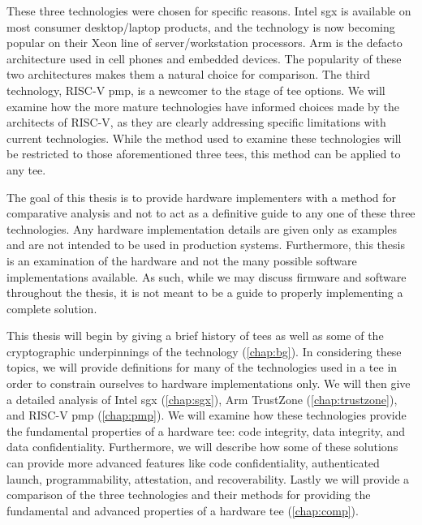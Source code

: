 These three technologies were chosen for specific reasons. Intel \gls{sgx} is available on most consumer desktop/laptop products, and the technology is now becoming popular on their Xeon line of server/workstation processors. Arm is the defacto architecture used in cell phones and embedded devices. The popularity of these two architectures makes them a natural choice for comparison. The third technology, RISC-V \gls{pmp}, is a newcomer to the stage of \gls{tee} options. We will examine how the more mature technologies have informed choices made by the architects of RISC-V, as they are clearly addressing specific limitations with current technologies. While the method used to examine these technologies will be restricted to those aforementioned three \glspl{tee}, this method can be applied to any \gls{tee}.

The goal of this thesis is to provide hardware implementers with a method for comparative analysis and not to act as a definitive guide to any one of these three technologies. Any hardware implementation details are given only as examples and are not intended to be used in production systems. Furthermore, this thesis is an examination of the hardware and not the many possible software implementations available. As such, while we may discuss firmware and software throughout the thesis, it is not meant to be a guide to properly implementing a complete solution.

This thesis will begin by giving a brief history of \glspl{tee} as well as some of the cryptographic underpinnings of the technology (\autoref{chap:bg}). In considering these topics, we will provide definitions for many of the technologies used in a \gls{tee} in order to constrain ourselves to hardware implementations only. We will then give a detailed analysis of Intel \gls{sgx} (\autoref{chap:sgx}), Arm TrustZone (\autoref{chap:trustzone}), and RISC-V \gls{pmp} (\autoref{chap:pmp}). We will examine how these technologies provide the fundamental properties of a hardware \gls{tee}: code integrity, data integrity, and data confidentiality. Furthermore, we will describe how some of these solutions can provide more advanced features like code confidentiality, authenticated launch, programmability, \gls{attestation}, and recoverability. Lastly we will provide a comparison of the three technologies and their methods for providing the fundamental and advanced properties of a hardware \gls{tee} (\autoref{chap:comp}).